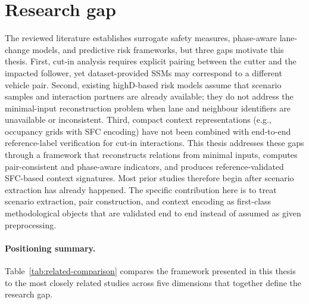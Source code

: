 \documentclass[12pt,a4paper,twoside,openright]{report}
\begin{document}
    \section{Research gap}
    The reviewed literature establishes surrogate safety measures, phase-aware lane-change models, and predictive risk frameworks, but three gaps motivate this thesis. First, cut-in analysis requires explicit pairing between the cutter and the impacted follower, yet dataset-provided SSMs may correspond to a different vehicle pair. Second, existing highD-based risk models assume that scenario samples and interaction partners are already available; they do not address the minimal-input reconstruction problem when lane and neighbour identifiers are unavailable or inconsistent. Third, compact context representations (e.g., occupancy grids with SFC encoding) have not been combined with end-to-end reference-label verification for cut-in interactions. This thesis addresses these gaps through a framework that reconstructs relations from minimal inputs, computes pair-consistent and phase-aware indicators, and produces reference-validated SFC-based context signatures. Most prior studies therefore begin after scenario extraction has already happened. The specific contribution here is to treat scenario extraction, pair construction, and context encoding as first-class methodological objects that are validated end to end instead of assumed as given preprocessing.


    \paragraph{Positioning summary.}
    Table~\ref{tab:related-comparison} compares the framework presented in this thesis to the most closely related studies across five dimensions that together define the research gap.
\end{document}
